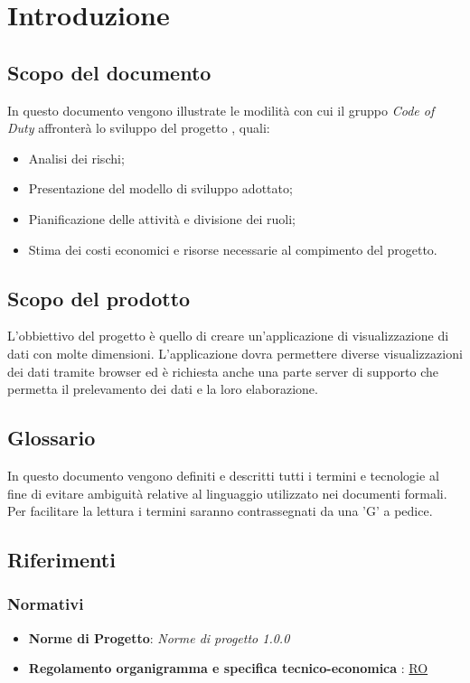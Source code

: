 \section{Introduzione}
\subsection{Scopo del documento}
	In questo documento vengono illustrate le modilità con cui il gruppo \textit{Code of Duty} affronterà lo sviluppo del progetto \hd, quali:
	\begin{itemize}
    		\item Analisi dei rischi;
    		\item Presentazione del modello di sviluppo adottato;
    		\item Pianificazione delle attività e divisione dei ruoli;
    		\item Stima dei costi economici e risorse necessarie al compimento del progetto.
	\end{itemize}
\subsection{Scopo del prodotto}
	L'obbiettivo del progetto è quello di creare un'applicazione di visualizzazione di dati con molte dimensioni. L'applicazione dovra permettere diverse visualizzazioni dei dati tramite browser ed è richiesta anche una parte server di supporto che permetta il prelevamento dei dati e la loro elaborazione.
\subsection{Glossario}
	In questo documento vengono definiti e descritti tutti i termini e tecnologie al fine di evitare ambiguità relative al linguaggio utilizzato nei documenti formali. Per facilitare la lettura i termini saranno contrassegnati da una 'G' a pedice.  
\subsection{Riferimenti}
	\subsubsection{Normativi}
		\begin{itemize}
			\item \textbf{Norme di Progetto}: \textit{Norme di progetto 1.0.0}
			\item \textbf{Regolamento organigramma e specifica tecnico-economica} : \href{https://www.math.unipd.it/~tullio/IS-1/2020/Progetto/RO.html}{RO}
		\end{itemize}
